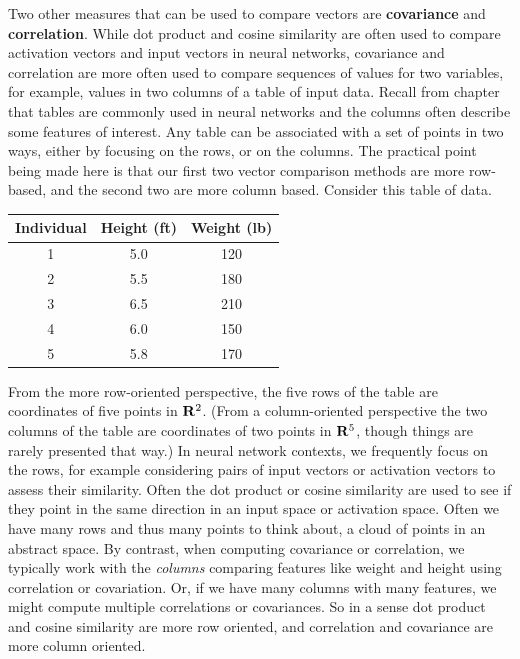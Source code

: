    Two other measures that can be used to compare vectors are \textbf{covariance} and \textbf{correlation}. While dot product and cosine similarity are often used to compare activation vectors and input vectors in neural networks, covariance and correlation are more often used to compare sequences of values for two variables, for example, values in two columns of a table of input data. Recall from chapter  that tables 
are commonly used in neural networks and the columns often describe some
features of interest. Any table can be associated with a set of points in two ways, either by focusing on the rows, or on the columns. The practical point being made here is that our first two vector comparison methods are more row-based, and the second two are more column based. Consider this table of data.
\begin{center}
\begin{tabular}{ccc}
\textbf{Individual} & \textbf{Height (ft)} & \textbf{Weight (lb)} \\
\hline
1 & 5.0 & 120 \\
2 & 5.5 & 180 \\
3 & 6.5 & 210 \\
4 & 6.0 & 150 \\
5 & 5.8 & 170 \\
\end{tabular}
\end{center}
From the more row-oriented perspective, the five rows of  the table are coordinates of five points in ${\bf R}^2$. (From a column-oriented perspective the two columns of the table are coordinates of two  points in ${\bf R}^5$, though things are rarely presented that way.) In neural network contexts, we frequently focus on the rows, for example considering pairs of input vectors or
activation vectors to assess their similarity. Often the dot product or cosine 
similarity are used to see if they point in the same direction in an input 
space or activation space. Often we have many rows and thus many points to 
think about, a cloud of points in an abstract space. By contrast, when computing
covariance or correlation, we typically work with the \emph{columns} comparing features like weight and height using correlation or covariation. Or, if we have many columns with many features, we might compute 
multiple correlations or covariances. So in a sense dot product and cosine 
similarity are more row oriented, and correlation and covariance are more 
column oriented.

   
